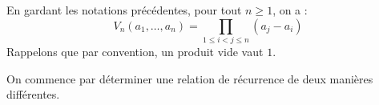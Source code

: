 \documentclass[a4paper,10pt]{report}
\begin{document}
\begin{Proposition}{} En gardant les notations précédentes, pour tout $n \geq 1$, on a :
$$ V_n(a_1, \ldots, a_n) = \prod_{1 \leq i<j \leq n} (a_j-a_i) $$
Rappelons que par convention, un produit vide vaut $1$.
\end{Proposition}

\begin{Demonstration}{} On commence par déterminer une relation de récurrence de deux manières différentes. 

%

\end{Demonstration}
\end{document}
